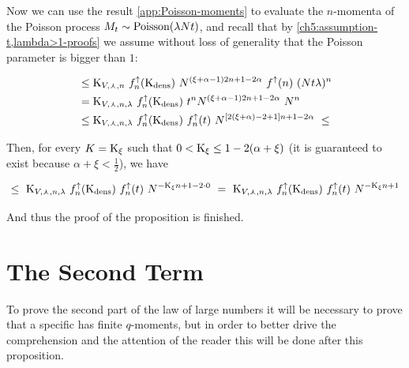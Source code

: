 	Now we can use the result \ref{app:Poisson-moments} to evaluate the $n$-momenta of the Poisson process $M_t \sim \text{Poisson}(\lambda N t)$, and recall that by \ref{ch5:assumption-t,lambda>1-proofs} we assume without loss of generality that the Poisson parameter is bigger than $1$:
		
	\begin{align*}
		&\leq
			\text{K}_{V,\curlywedge,n}\
			f^\uparrow_n(\text{K}_{\text{dens}})\
			N^{(\xi + \alpha-1) 2 n + 1 -2\alpha}\
			f^\uparrow(n)\
			(Nt\lambda)^n
		\\
		&=
		\text{K}_{V,\curlywedge,n,\lambda}\
		f^\uparrow_n(\text{K}_{\text{dens}})\
		t^n
			N^{(\xi + \alpha-1) 2 n + 1 -2\alpha}\
			N^n\
		\\
		&\leq
			\text{K}_{V,\curlywedge,n,\lambda}\
			f^\uparrow_n(\text{K}_{\text{dens}})\
			f^\uparrow_n(t)\
			N^{ [2(\xi + \alpha) - 2 + 1] n + 1 -2\alpha}\
		\leq
	\end{align*}
	
	Then, for every $K = \text{K}_\xi$ such that $0 < \text{K}_\xi \leq 1 - 2(\alpha + \xi)$ (it is guaranteed to exist because $\alpha + \xi < \frac{1}{2}$), we have
	
	\begin{equation*}
		\leq\
			\text{K}_{V,\curlywedge,n,\lambda}\
			f^\uparrow_n(\text{K}_{\text{dens}})\
			f^\uparrow_n(t)\
			N^{ -\text{K}_\xi n + 1 -2\cdot 0}\
		=\
			\text{K}_{V,\curlywedge,n,\lambda}\
			f^\uparrow_n(\text{K}_{\text{dens}})\
			f^\uparrow_n(t)\
			N^{ -\text{K}_\xi n + 1}
	\end{equation*}
	
	And thus the proof of the proposition is finished.


\section{The Second Term}

To prove the second part of the law of large numbers it will be necessary to prove that a specific \rv has finite $q$-moments, but in order to better drive the comprehension and the attention of the reader this will be done after this proposition.

